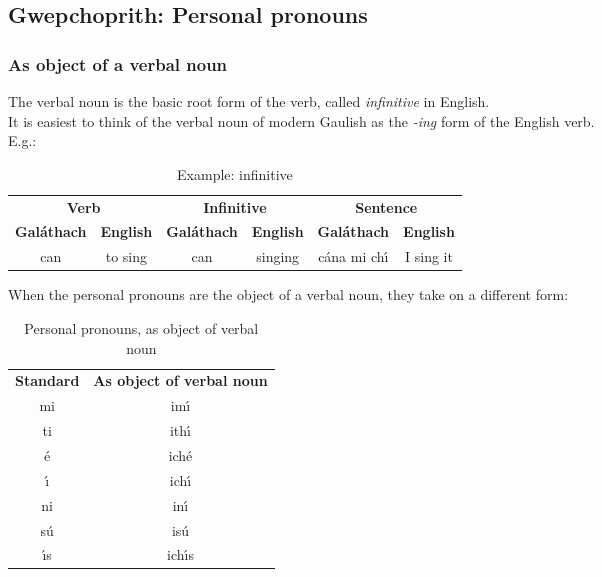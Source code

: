\subsection{Gwepchoprith: Personal pronouns}
\subsubsection{As object of a verbal noun}

The verbal noun is the basic root form of the verb, called \textit{infinitive} in English.\\

It is easiest to think of the verbal noun of modern Gaulish as the \textit{-ing} form of the English verb.\\

E.g.:\\
\begin{table}[H]
\centering
\begin{tabular}{cccccc}
  \toprule
  \multicolumn{2}{c}{\textbf{Verb}} & \multicolumn{2}{c}{\textbf{Infinitive}} & \multicolumn{2}{c}{\textbf{Sentence}}\\
  \cmidrule(lr){1-2}\cmidrule(lr){3-4}\cmidrule(lr){5-6}
  \textbf{Gal\'{a}thach} & \textbf{English} & \textbf{Gal\'{a}thach} & \textbf{English} & \textbf{Gal\'{a}thach} & \textbf{English}\\
  \cmidrule(lr){1-1}\cmidrule(lr){2-2}\cmidrule(lr){3-3}\cmidrule(lr){4-4}\cmidrule(lr){5-5}\cmidrule(lr){6-6}
  can & to sing & can & singing & c\'{a}na mi ch\'{\i} & I sing it\\
  \bottomrule
\end{tabular}
\caption{Example: infinitive}
\label{example_verbs_infinitive}
\end{table}

When the personal pronouns are the object of a verbal noun, they take on a different form:
\begin{table}[H]
\centering
\begin{tabular}{cc}
  \toprule
  \textbf{Standard} & \textbf{As object of verbal noun}\\
  \cmidrule(lr){1-1}\cmidrule(lr){2-2}
  mi & im\'{\i}\\
  ti & ith\'{\i}\\
  \'{e} & ich\'{e}\\
  \'{\i} & ich\'{\i}\\
  ni & in\'{\i}\\
  s\'{u} & is\'{u}\\
  \'{\i}s & ich\'{\i}s\\
  \bottomrule
\end{tabular}
\caption{Personal pronouns, as object of verbal noun}
\label{personal_pronouns_as_object_of_verbal_noun}
\end{table}

